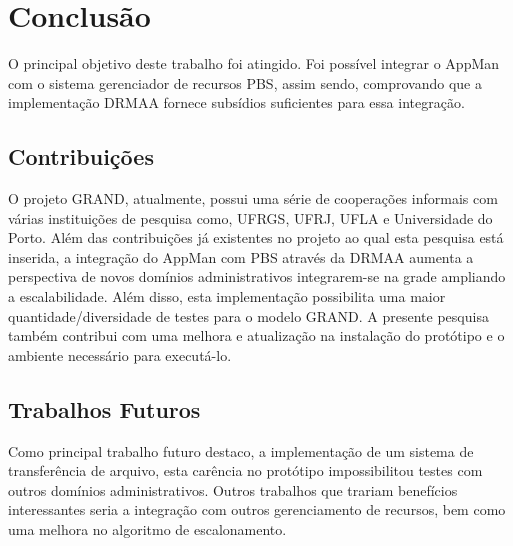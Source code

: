 \chapter{Conclusão}
\label{cap:conclusao}

O principal objetivo deste trabalho foi atingido. Foi possível integrar o AppMan com o sistema gerenciador de recursos PBS, assim sendo, comprovando que a implementação DRMAA fornece subsídios suficientes para essa integração. 

\section{Contribuições}
O projeto GRAND, atualmente, possui uma série de cooperações informais com várias instituições de pesquisa como, UFRGS, UFRJ, UFLA e Universidade do Porto. Além das contribuições já existentes no projeto ao qual esta pesquisa está inserida, a integração do AppMan com PBS através da DRMAA aumenta a perspectiva de novos domínios administrativos integrarem-se na grade ampliando a escalabilidade. Além disso, esta implementação possibilita uma maior quantidade/diversidade de testes para o modelo GRAND. A presente pesquisa também contribui com uma melhora e atualização na instalação do protótipo e o ambiente necessário para executá-lo.

\section{Trabalhos Futuros}
\label{sec:trab_futuros}
Como principal trabalho futuro destaco, a implementação de um sistema de transferência de arquivo, esta carência no protótipo impossibilitou testes com outros domínios administrativos. Outros trabalhos que trariam benefícios interessantes seria a integração com outros gerenciamento de recursos, bem como uma melhora no algoritmo de escalonamento.